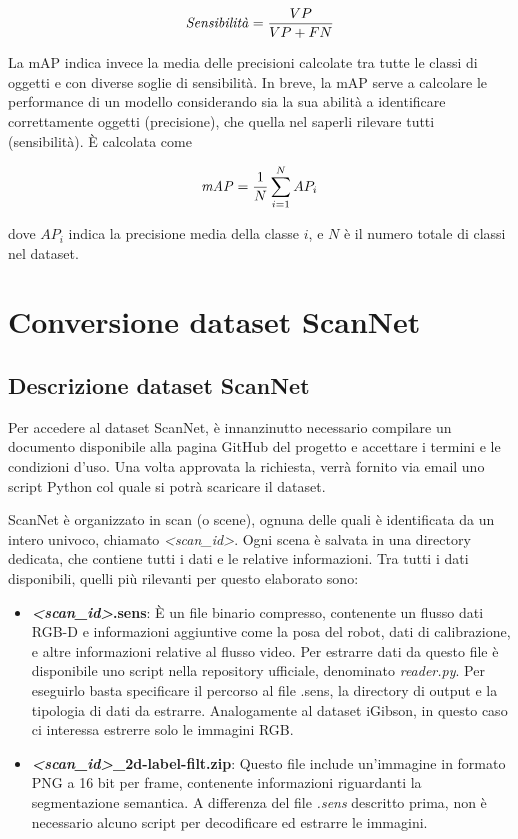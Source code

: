\documentclass[12pt]{report}
\begin{document}
\[ \text{\textit{Sensibilità}} = \frac{VP}{VP + FN} \]

La mAP indica invece la media delle precisioni calcolate tra tutte le classi di oggetti e con diverse soglie di sensibilità. In breve, la mAP serve a calcolare le performance di un modello considerando sia la sua abilità a identificare correttamente oggetti (precisione), che quella nel saperli rilevare tutti (sensibilità). È calcolata come

\[ \text{\textit{mAP}} = \frac{1}{N} \sum_{i=1}^{N} AP_i \]

dove $AP_i$ indica la precisione media della classe $i$, e $N$ è il numero totale di classi nel dataset.

\section{Conversione dataset ScanNet}
\label{chap:conversione_dataset_scannet}

\subsection{Descrizione dataset ScanNet}
\label{chap:descrizione_dataset_scannet}

Per accedere al dataset ScanNet, è innanzinutto necessario compilare un documento disponibile alla pagina GitHub del progetto e accettare i termini e le condizioni d'uso. Una volta approvata la richiesta, verrà fornito via email uno script Python col quale si potrà scaricare il dataset.

ScanNet è organizzato in scan (o scene), ognuna delle quali è identificata da un intero univoco, chiamato \textit{<scan\_id>}. Ogni scena è salvata in una directory dedicata, che contiene tutti i dati e le relative informazioni. Tra tutti i dati disponibili, quelli più rilevanti per questo elaborato sono:

\begin{itemize}
	\item \textbf{\textit{<scan\_id>}.sens}: È un file binario compresso, contenente un flusso dati RGB-D e informazioni aggiuntive come la posa del robot, dati di calibrazione, e altre informazioni relative al flusso video. Per estrarre dati da questo file è disponibile uno script nella repository ufficiale, denominato \textit{reader.py}. Per eseguirlo basta specificare il percorso al file .sens, la directory di output e la tipologia di dati da estrarre. Analogamente al dataset iGibson, in questo caso ci interessa estrerre solo le immagini RGB.
	
	\item \textbf{\textit{<scan\_id>}\_2d-label-filt.zip}: Questo file include un'immagine in formato PNG a 16 bit per frame, contenente informazioni riguardanti la segmentazione semantica. A differenza del file \textit{.sens} descritto prima, non è necessario alcuno script per decodificare ed estrarre le immagini.
\end{itemize}
\end{document}
